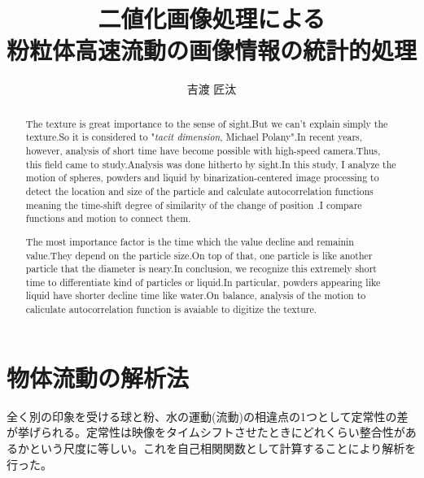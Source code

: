 \documentclass[a4paper,12pt,dvipdfmx]{jsarticle}
\title{二値化画像処理による \\ 粉粒体高速流動の画像情報の統計的処理}
\author{吉渡 匠汰}
\date{ } %
\begin{document}

\maketitle
\begin{abstract}
The texture is great importance to the sense of sight.But we can't explain simply the texture.So it is considered to "{\it tacit dimension}, Michael Polany".In recent years, however, analysis of short time have become possible with high-speed camera.Thus, this field came to study.Analysis was done hitherto by sight.In this study, I analyze the motion of spheres, powders and liquid by binarization-centered image processing to detect the location and size of the particle and calculate autocorrelation functions meaning the time-shift degree of similarity of the change of position .I compare functions and motion to connect them. \par
The most importance factor is the time which the value decline and remainin value.They depend on the particle size.On top of that, one particle is like another particle that the diameter is neary.In conclusion, we recognize this extremely short time to differentiate kind of particles or liquid.In particular, powders appearing like liquid have shorter decline time like water.On balance, analysis of the motion to caliculate autocorrelation function is avaiable to digitize the texture.
\end{abstract}

\clearpage

\tableofcontents

\clearpage

\section{物体流動の解析法}
%

全く別の印象を受ける球と粉、水の運動(流動)の相違点の1つとして定常性の差が挙げられる。定常性は映像をタイムシフトさせたときにどれくらい整合性があるかという尺度に等しい。これを自己相関関数として計算することにより解析を行った。
\end{document}
